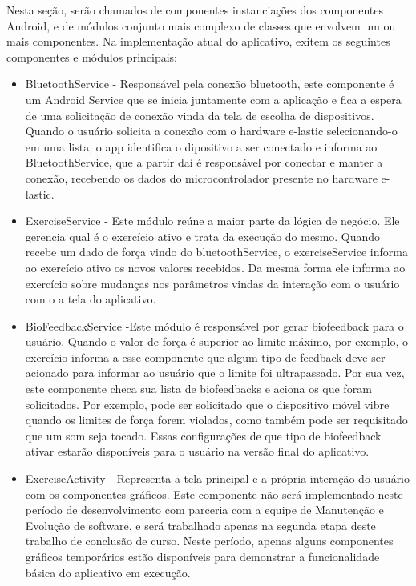 Nesta seção, serão chamados de componentes instanciações dos componentes Android, e de módulos conjunto mais complexo de classes que envolvem um ou mais componentes. Na implementação atual do aplicativo, exitem os seguintes componentes e módulos principais:
\begin{itemize}
	\item BluetoothService - Responsável pela conexão bluetooth, este componente é um Android Service que se inicia juntamente com a aplicação e fica a espera de uma solicitação de conexão vinda da tela de escolha de dispositivos. Quando o usuário solicita a conexão com o hardware e-lastic selecionando-o em uma lista, o app identifica o dipositivo a ser conectado e informa ao BluetoothService, que a partir daí é responsável por conectar e manter a conexão, recebendo os dados do microcontrolador presente no hardware e-lastic.
	\item ExerciseService - Este módulo reúne a maior parte da lógica de negócio. Ele gerencia qual é o exercício ativo e trata da execução do mesmo. Quando recebe um dado de força vindo do bluetoothService, o exerciseService informa ao exercício ativo os novos valores recebidos. Da mesma forma ele informa ao exercício sobre mudanças nos parâmetros vindas da interação com o usuário com o a tela do aplicativo.
	\item BioFeedbackService -Este módulo é responsável por gerar biofeedback para o usuário. Quando o valor de força é superior ao limite máximo, por exemplo, o exercício informa a esse componente que algum tipo de feedback deve ser acionado para informar ao usuário que o limite foi ultrapassado. Por sua vez, este componente checa sua lista de biofeedbacks e aciona os que foram solicitados. Por exemplo, pode ser solicitado que o dispositivo móvel vibre quando os limites de força forem violados, como também pode ser requisitado que um som seja tocado. Essas configurações de que tipo de biofeedback ativar estarão disponíveis para o usuário na versão final do aplicativo.  
	\item ExerciseActivity - Representa a tela principal e a própria interação do usuário com os componentes gráficos. Este componente não será implementado neste período de desenvolvimento com parceria com a equipe de Manutenção e Evolução de software, e será trabalhado apenas na segunda etapa deste trabalho de conclusão de curso. Neste período, apenas alguns componentes gráficos temporários estão disponíveis para demonstrar a funcionalidade básica do aplicativo em execução.
\end{itemize} 

